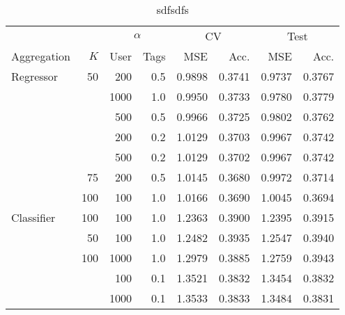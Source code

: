 \begin{table}
\centering
\begin{tabular}{lrrrrrrr}
\toprule
           &     & \multicolumn{2}{c}{$\alpha$} &  \multicolumn{2}{c}{CV} & \multicolumn{2}{c}{Test} \\
           \cmidrule(lr){3-4}\cmidrule(lr){5-6}\cmidrule(l){7-8}
Aggregation & $K$ & User & Tags &  MSE & Acc. & MSE & Acc.  \\
\midrule
Regressor & 50  & 200  & 0.5 &  0.9898 &      0.3741 &   0.9737 &        0.3767 \\
           &     & 1000 & 1.0 &  0.9950 &      0.3733 &   0.9780 &        0.3779 \\
           &     & 500  & 0.5 &  0.9966 &      0.3725 &   0.9802 &        0.3762 \\
           &     & 200  & 0.2 &  1.0129 &      0.3703 &   0.9967 &        0.3742 \\
           &     & 500  & 0.2 &  1.0129 &      0.3702 &   0.9967 &        0.3742 \\
           & 75  & 200  & 0.5 &  1.0145 &      0.3680 &   0.9972 &        0.3714 \\
           & 100 & 100  & 1.0 &  1.0166 &      0.3690 &   1.0045 &        0.3694 \\
Classifier & 100 & 100  & 1.0 &  1.2363 &      0.3900 &   1.2395 &        0.3915 \\
           & 50  & 100  & 1.0 &  1.2482 &      0.3935 &   1.2547 &        0.3940 \\
           & 100 & 1000 & 1.0 &  1.2979 &      0.3885 &   1.2759 &        0.3943 \\
           &     & 100  & 0.1 &  1.3521 &      0.3832 &   1.3454 &        0.3832 \\
           &     & 1000 & 0.1 &  1.3533 &      0.3833 &   1.3484 &        0.3831 \\
\bottomrule
\end{tabular}
\caption{sdfsdfs}
\label{tab:results.knn}
\end{table}
